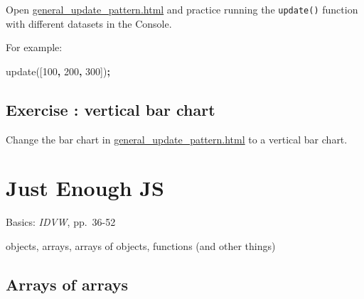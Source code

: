 \documentclass[openany]{book}
\newenvironment{Shaded}{\begin{snugshade}}{\end{snugshade}}
\newcommand{\AttributeTok}[1]{\textcolor[rgb]{0.77,0.63,0.00}{#1}}
\newcommand{\DecValTok}[1]{\textcolor[rgb]{0.00,0.00,0.81}{#1}}
\newcommand{\NormalTok}[1]{#1}
\newcommand{\OperatorTok}[1]{\textcolor[rgb]{0.81,0.36,0.00}{\textbf{#1}}}
\begin{document}
Open \href{code/general_update_pattern.html}{general\_update\_pattern.html} and practice running the \texttt{update()} function with different datasets in the Console.

For example:

\begin{Shaded}
\begin{Highlighting}[]
\AttributeTok{update}\NormalTok{([}\DecValTok{100}\OperatorTok{,} \DecValTok{200}\OperatorTok{,} \DecValTok{300}\NormalTok{])}\OperatorTok{;}
\end{Highlighting}
\end{Shaded}

\hypertarget{exercise-vertical-bar-chart}{%
\section{Exercise : vertical bar chart}\label{exercise-vertical-bar-chart}}

Change the bar chart in \href{code/general_update_pattern.html}{general\_update\_pattern.html} to a vertical bar chart.

\hypertarget{just-enough-js}{%
\chapter{Just Enough JS }\label{just-enough-js}}

Basics: \emph{IDVW}, pp.~36-52

objects, arrays, arrays of objects, functions (and other things)

\hypertarget{arrays-of-arrays}{%
\section{Arrays of arrays}\label{arrays-of-arrays}}
\end{document}
